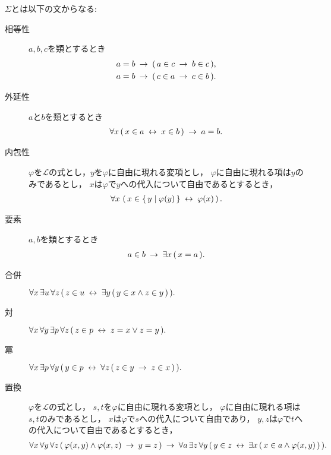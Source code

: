 	$\Sigma$とは以下の文からなる:
	\begin{description}
		\item[相等性] $a,b,c$を類とするとき
			\begin{align}
				&a = b \hspace{0.25em}\rightarrow\hspace{0.25em} (\, a \in c \hspace{0.25em}\rightarrow\hspace{0.25em} b \in c\, ), \\
				&a = b \hspace{0.25em}\rightarrow\hspace{0.25em} (\, c \in a \hspace{0.25em}\rightarrow\hspace{0.25em} c \in b\, ).
			\end{align}
			
		\item[外延性] $a$と$b$を類とするとき
			\begin{align}
				\forall x\, (\, x \in a \hspace{0.25em}\leftrightarrow\hspace{0.25em} x \in b\, ) \hspace{0.25em}\rightarrow\hspace{0.25em} a = b.
			\end{align}
			
		\item[内包性] $\varphi$を$\mathcal{L}$の式とし，$y$を$\varphi$に自由に現れる変項とし，
			$\varphi$に自由に現れる項は$y$のみであるとし，
			$x$は$\varphi$で$y$への代入について自由であるとするとき，
			\begin{align}
				\forall x\, \left(\, x \in \left\{\, y \mid \varphi(y)\, \right\} \hspace{0.25em}\leftrightarrow\hspace{0.25em} \varphi(x)\, \right).
			\end{align}
		
		\item[要素] $a,b$を類とするとき
			\begin{align}
				a \in b \hspace{0.25em}\rightarrow\hspace{0.25em} \exists x\, (\, x = a\, ).
			\end{align}
			
		\item[合併] $\forall x\, \exists u\, \forall z\, (\, z \in u \hspace{0.25em}\leftrightarrow\hspace{0.25em}
			\exists y\, (\, y \in x \wedge z \in y\, )\, ).$
			
		\item[対] $\forall x\, \forall y\, \exists p\, \forall z\, 
			(\, z \in p \hspace{0.25em}\leftrightarrow\hspace{0.25em} z = x \vee z = y\, ).$
			
		\item[冪] $\forall x\, \exists p\, \forall y\, 
			(\, y \in p \hspace{0.25em}\leftrightarrow\hspace{0.25em} \forall z\, (\, z \in y \hspace{0.25em}\rightarrow\hspace{0.25em} z \in x\, )\, ).$
			
		\item[置換] $\varphi$を$\mathcal{L}$の式とし，
			$s,t$を$\varphi$に自由に現れる変項とし，
			$\varphi$に自由に現れる項は$s,t$のみであるとし，
			$x$は$\varphi$で$s$への代入について自由であり，
			$y,z$は$\varphi$で$t$への代入について自由であるとするとき，
			\begin{align}
				\forall x\, \forall y\, \forall z\, 
				(\, \varphi(x,y) \wedge \varphi(x,z)
				\hspace{0.25em}\rightarrow\hspace{0.25em} y = z\, )
				\hspace{0.25em}\rightarrow\hspace{0.25em} \forall a\, \exists z\, \forall y\,
				(\, y \in z \hspace{0.25em}\leftrightarrow\hspace{0.25em} \exists x\, (\, x \in a \wedge 
				\varphi(x,y)\, )\, ).
			\end{align}
			

\end{description}
